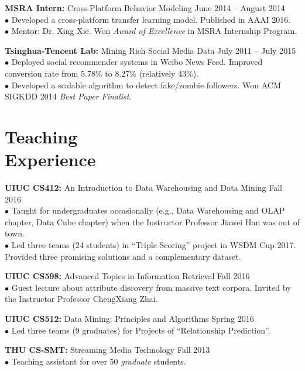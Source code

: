 \documentclass[margin, 10pt]{res}
\begin{document}
\begin{resume}
{\textbf{MSRA Intern:} Cross-Platform Behavior Modeling} \hfill{June 2014 -- August 2014} \\
$\bullet$ Developed a cross-platform transfer learning model. Published in AAAI 2016. \\
$\bullet$ Mentor: Dr. Xing Xie. Won \textit{Award of Excellence} in MSRA Internship Program.

{\textbf{Tsinghua-Tencent Lab:} Mining Rich Social Media Data} \hfill{July 2011 -- July 2015} \\
$\bullet$ Deployed social recommender systems in Weibo News Feed. Improved conversion rate from 5.78\% to 8.27\% (relatively 43\%). \\
$\bullet$ Developed a scalable algorithm to detect fake/zombie followers. Won ACM SIGKDD 2014 \textit{Best Paper Finalist}.


\section{Teaching \\ Experience}

{\textbf{UIUC CS412:} An Introduction to Data Warehousing and Data Mining} \hfill{Fall 2016} \\
$\bullet$ Taught for undergraduates occasionally (e.g., Data Warehousing and OLAP chapter, Data Cube chapter) when the Instructor Professor Jiawei Han was out of town. \\
$\bullet$ Led three teams (24 students) in ``Triple Scoring'' project in WSDM Cup 2017. Provided three promising solutions and a complementary dataset.

{\textbf{UIUC CS598:} Advanced Topics in Information Retrieval} \hfill{Fall 2016} \\
$\bullet$ Guest lecture about attribute discovery from massive text corpora. Invited by the Instructor Professor ChengXiang Zhai.

{\textbf{UIUC CS512:} Data Mining: Principles and Algorithms} \hfill{Spring 2016} \\
$\bullet$ Led three teams (9 graduates) for Projects of ``Relationship Prediction''.

{\textbf{THU CS-SMT:} Streaming Media Technology} \hfill{Fall 2013} \\
$\bullet$ Teaching assistant for over 50 \textit{graduate} students.


\end{resume}
\end{document}
